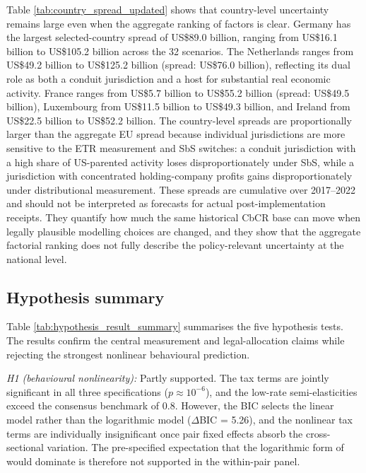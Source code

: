 \documentclass[11pt,a4paper]{article}
\begin{document}



Table \ref{tab:country_spread_updated} shows that country-level uncertainty remains large even when the aggregate ranking of factors is clear. Germany has the largest selected-country spread of US\$89.0 billion, ranging from US\$16.1 billion to US\$105.2 billion across the 32 scenarios. The Netherlands ranges from US\$49.2 billion to US\$125.2 billion (spread: US\$76.0 billion), reflecting its dual role as both a conduit jurisdiction and a host for substantial real economic activity. France ranges from US\$5.7 billion to US\$55.2 billion (spread: US\$49.5 billion), Luxembourg from US\$11.5 billion to US\$49.3 billion, and Ireland from US\$22.5 billion to US\$52.2 billion. The country-level spreads are proportionally larger than the aggregate EU spread because individual jurisdictions are more sensitive to the ETR measurement and SbS switches: a conduit jurisdiction with a high share of US-parented activity loses disproportionately under SbS, while a jurisdiction with concentrated holding-company profits gains disproportionately under distributional measurement. These spreads are cumulative over 2017--2022 and should not be interpreted as forecasts for actual post-implementation receipts. They quantify how much the same historical CbCR base can move when legally plausible modelling choices are changed, and they show that the aggregate factorial ranking does not fully describe the policy-relevant uncertainty at the national level.

\subsection{Hypothesis summary}\label{sec:results_hypotheses}



Table \ref{tab:hypothesis_result_summary} summarises the five hypothesis tests. The results confirm the central measurement and legal-allocation claims while rejecting the strongest nonlinear behavioural prediction.

\textit{H1 (behavioural nonlinearity):} Partly supported. The tax terms are jointly significant in all three specifications ($p \approx 10^{-6}$), and the low-rate semi-elasticities exceed the consensus benchmark of 0.8. However, the BIC selects the linear model rather than the logarithmic model ($\Delta$BIC = 5.26), and the nonlinear tax terms are individually insignificant once pair fixed effects absorb the cross-sectional variation. The pre-specified expectation that the logarithmic form of \citet{garcia-bernardo2024} would dominate is therefore not supported in the within-pair panel.
\end{document}
